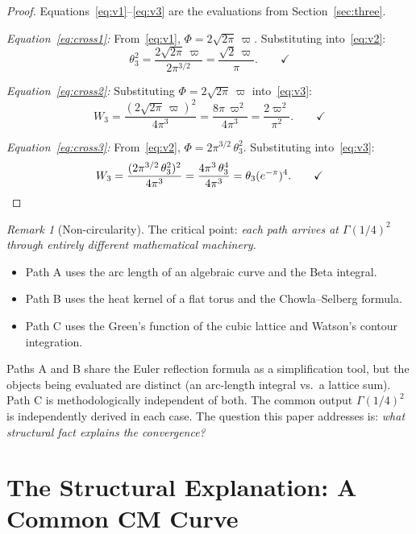 \documentclass[12pt]{article}
\theoremstyle{definition}
\theoremstyle{remark}
\newtheorem{remark}[theorem]{Remark}
\begin{document}
\begin{proof}
Equations~\eqref{eq:v1}--\eqref{eq:v3} are the evaluations from Section~\ref{sec:three}.

\emph{Equation~\eqref{eq:cross1}:} From~\eqref{eq:v1}, $\Phi = 2\sqrt{2\pi}\,\varpi$. Substituting into~\eqref{eq:v2}:
\[
    \theta_3^2 = \frac{2\sqrt{2\pi}\,\varpi}{2\pi^{3/2}} = \frac{\sqrt{2}\,\varpi}{\pi}. \qquad\checkmark
\]

\emph{Equation~\eqref{eq:cross2}:} Substituting $\Phi = 2\sqrt{2\pi}\,\varpi$ into~\eqref{eq:v3}:
\[
    W_3 = \frac{(2\sqrt{2\pi}\,\varpi)^2}{4\pi^3} = \frac{8\pi\,\varpi^2}{4\pi^3} = \frac{2\varpi^2}{\pi^2}. \qquad\checkmark
\]

\emph{Equation~\eqref{eq:cross3}:} From~\eqref{eq:v2}, $\Phi = 2\pi^{3/2}\,\theta_3^2$. Substituting into~\eqref{eq:v3}:
\[
    W_3 = \frac{(2\pi^{3/2}\,\theta_3^2)^2}{4\pi^3} = \frac{4\pi^3\,\theta_3^4}{4\pi^3} = \theta_3(e^{-\pi})^4. \qquad\checkmark\qedhere
\]
\end{proof}

\begin{remark}[Non-circularity]
\label{rmk:noncircular}
The critical point: \emph{each path arrives at $\Gamma(1/4)^2$ through entirely different mathematical machinery.}
\begin{itemize}[nosep]
    \item Path A uses the arc length of an algebraic curve and the Beta integral.
    \item Path B uses the heat kernel of a flat torus and the Chowla--Selberg formula.
    \item Path C uses the Green's function of the cubic lattice and Watson's contour integration.
\end{itemize}
Paths A and B share the Euler reflection formula as a simplification tool, but the objects being evaluated are distinct (an arc-length integral vs.\ a lattice sum). Path C is methodologically independent of both. The common output $\Gamma(1/4)^2$ is independently derived in each case. The question this paper addresses is: \emph{what structural fact explains the convergence?}
\end{remark}

\section{The Structural Explanation: A Common CM Curve}
\label{sec:cm}
\end{document}
